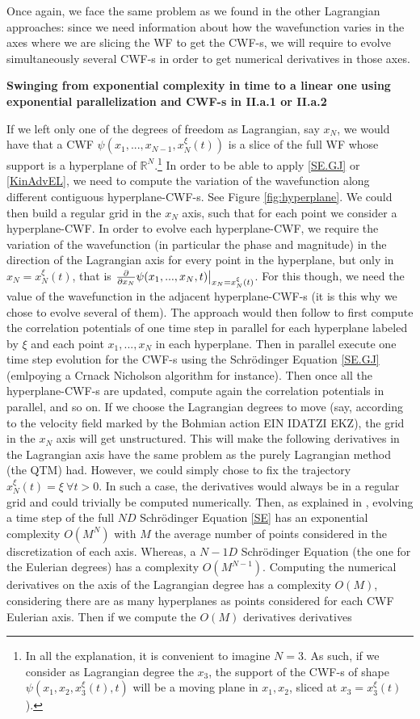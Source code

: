 \documentclass[11pt, a4paper]{article} %
\newcommand{\R}{\mathbb{R}} %
\DeclareRobustCommand{\mybox}[2][gray!20]{%
\begin{tcolorbox}[   %
        left=1cm,
        right=1cm,
        top=0.5cm,
        bottom=0.5cm,
        colback=#1,
        colframe=#1,
        width=\dimexpr\textwidth\relax, 
        enlarge left by=0mm,
        boxsep=5pt,
        arc=0pt,outer arc=0pt,
        ]
        #2
\end{tcolorbox}
}
\begin{document}
Once again, we face the same problem as we found in the other Lagrangian approaches: since we need information about how the wavefunction varies in the axes where we are slicing the WF to get the CWF-s, we will require to evolve simultaneously several CWF-s in order to get numerical derivatives in those axes. 
\mybox{
{\bf Swinging from exponential complexity in time to a linear one using exponential parallelization and CWF-s in II.a.1 or II.a.2\\ }

If we left only one of the degrees of freedom as Lagrangian, say $x_N$, we would have that a CWF $\psi(x_1,...,x_{N-1},x_N^\xi(t))$ is a slice of the full WF whose support is a hyperplane of $\R^N$.\footnote{In all the explanation, it is convenient to imagine $N=3$. As such, if we consider as Lagrangian degree the $x_3$, the support of the CWF-s of shape $\psi(x_1,x_2,x_3^\xi(t),t)$ will be a moving plane in $x_1,x_2$, sliced at $x_3=x_3^\xi(t)$).} In order to be able to apply \eqref{SE.GJ} or \eqref{KinAdvEL}, we need to compute the variation of the wavefunction along different contiguous hyperplane-CWF-s. See Figure \ref{fig:hyperplane}. We could then build a regular grid in the $x_N$ axis, such that for each point we consider a hyperplane-CWF. In order to evolve each hyperplane-CWF, we require the variation of the wavefunction (in particular the phase and magnitude) in the direction of the Lagrangian axis for every point in the hyperplane, but only in $x_N=x_N^\xi(t)$, that is $\pdv{}{x_N}\psi(x_1,...,x_N,t)\big\rvert_{x_N=x_N^\xi(t)}$. For this though, we need the value of the wavefunction in the adjacent hyperplane-CWF-s (it is this why we chose to evolve several of them). The approach would then follow to first compute the correlation potentials of one time step in parallel for each hyperplane labeled by $\xi$ and each point $x_1,...,x_N$ in each hyperplane. Then in parallel execute one time step evolution for the CWF-s using the Schrödinger Equation \eqref{SE.GJ} (emlpoying a Crnack Nicholson algorithm for instance). Then once all the hyperplane-CWF-s are updated, compute again the correlation potentials in parallel, and so on. If we choose the Lagrangian degrees to move (say, according to the velocity field marked by the Bohmian action EIN IDATZI EKZ), the grid in the $x_N$ axis will get unstructured. This will make the following derivatives in the Lagrangian axis have the same problem as the purely Lagrangian method (the QTM) had. However, we could simply chose to fix the trajectory $x_N^\xi(t)=\xi\ \forall t>0$. In such a case, the derivatives would always be in a regular grid and could trivially be computed  numerically. Then, as explained in \cite{NireTFGie}, evolving a time step of the full $ND$ Schrödinger Equation \eqref{SE} has an exponential complexity $O(M^N)$ with $M$ the average number of points considered in the discretization of each axis. Whereas, a $N-1D$ Schrödinger Equation (the one for the Eulerian degrees) has a complexity $O(M^{N-1})$. Computing the numerical derivatives on the axis of the Lagrangian degree has a complexity $O(M)$, considering there are as many hyperplanes as points considered for each CWF Eulerian axis. Then if we compute the $O(M)$ derivatives derivatives }
\end{document}
